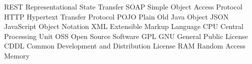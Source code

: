 	{REST}	{Representational State Transfer}
	{SOAP}	{Simple Object Access Protocol}
	{HTTP}	{Hypertext Transfer Protocol}
	{POJO}	{Plain Old Java Object}
	{JSON}	{JavaScript Object Notation}
	{XML}	{Extensible Markup Language}
	{CPU}	{Central Processing Unit}
	{OSS}	{Open Source Software}
	{GPL}	{GNU General Public License}
	{CDDL}	{Common Development and Distribution License}
	{RAM}	{Random Access Memory}
